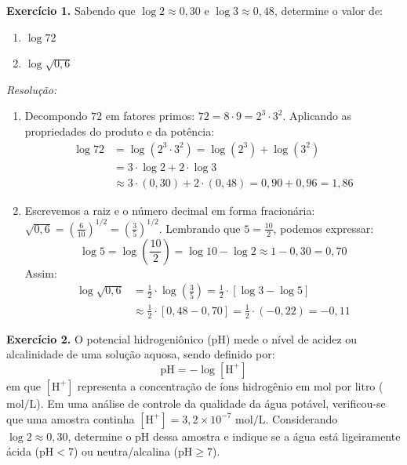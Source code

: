 \documentclass[12pt,a4paper]{report}
\begin{document}
	\textbf{Exercício 1.} Sabendo que $\log 2 \approx 0{,}30$ e $\log 3 \approx 0{,}48$, determine o valor de:
	\begin{enumerate}[label=\textbf{\alph*)}]
		\item $\log 72$
		\item $\log \sqrt{0{,}6}$
	\end{enumerate}
	
	\textit{Resolução:}
	\begin{enumerate}[label=\textbf{\alph*)}]
		\item Decompondo $72$ em fatores primos: $72 = 8 \cdot 9 = 2^3 \cdot 3^2$.  
		Aplicando as propriedades do produto e da potência:
		\begin{align*}
			\log 72 &= \log(2^3 \cdot 3^2) = \log(2^3) + \log(3^2) \\
			&= 3 \cdot \log 2 + 2 \cdot \log 3 \\
			&\approx 3 \cdot (0{,}30) + 2 \cdot (0{,}48) = 0{,}90 + 0{,}96 = 1{,}86
		\end{align*}
		
		\item Escrevemos a raiz e o número decimal em forma fracionária: $\sqrt{0{,}6} = \left(\frac{6}{10}\right)^{1/2} = \left(\frac{3}{5}\right)^{1/2}$.  
		Lembrando que $5 = \frac{10}{2}$, podemos expressar:
		$$\log 5 = \log\left(\frac{10}{2}\right) = \log 10 - \log 2 \approx 1 - 0{,}30 = 0{,}70$$
		Assim:
		\begin{align*}
			\log \sqrt{0{,}6} &= \frac{1}{2} \cdot \log\left(\frac{3}{5}\right) = \frac{1}{2} \cdot [\log 3 - \log 5] \\
			&\approx \frac{1}{2} \cdot [0{,}48 - 0{,}70] = \frac{1}{2} \cdot (-0{,}22) = -0{,}11
		\end{align*}
	\end{enumerate}
	
	\vspace{0.3cm}
	
	\textbf{Exercício 2.}  O potencial hidrogeniônico ($\text{pH}$) mede o nível de acidez ou alcalinidade de uma solução aquosa, sendo definido por:
	$$\text{pH} = -\log [\text{H}^+]$$
	em que $[\text{H}^+]$ representa a concentração de íons hidrogênio em mol por litro ($\text{mol/L}$).  
	Em uma análise de controle da qualidade da água potável, verificou-se que uma amostra continha $[\text{H}^+] = 3{,}2 \times 10^{-7}\text{ mol/L}$. Considerando $\log 2 \approx 0{,}30$, determine o $\text{pH}$ dessa amostra e indique se a água está ligeiramente ácida ($\text{pH} < 7$) ou neutra/alcalina ($\text{pH} \geqslant 7$).
	
\end{document}
